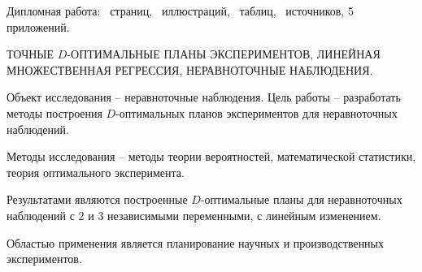 Дипломная работа: \ страниц, \totalfigures{}~иллюстраций, \totaltables{}\ таблиц,
\ источников, 5 приложений.

\vspace{\baselineskip}

ТОЧНЫЕ $D$-ОПТИМАЛЬНЫЕ ПЛАНЫ ЭКСПЕРИМЕНТОВ, ЛИНЕЙНАЯ МНОЖЕСТВЕННАЯ РЕГРЕССИЯ, НЕРАВНОТОЧНЫЕ НАБЛЮДЕНИЯ.

\vspace{\baselineskip}

Объект исследования – неравноточные наблюдения. Цель работы – разработать методы построения $D$-оптимальных планов экспериментов для неравноточных наблюдений.

Методы исследования – методы теории вероятностей, математической
статистики, теория оптимального эксперимента.

Результатами являются построенные $D$-оптимальные планы для неравноточных наблюдений с 2 и 3 независимыми переменными, с линейным изменением.

Областью применения является планирование научных и производственных экспериментов.
